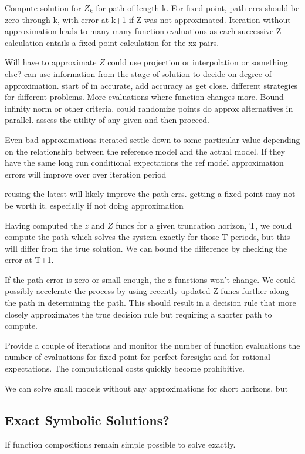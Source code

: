\documentclass[12pt]{article}
\begin{document}
Compute solution for $Z_k$ for path of length k.  For fixed point, path errs should be zero through k, with error at k+1 if Z was not approximated. 
Iteration without approximation leads to many many function evaluations as each successive Z calculation entails a fixed point calculation for the xz pairs.

Will have to approximate  $Z$  could use projection or interpolation or something else?  can use information from the stage of solution to decide on degree of approximation.  start of in accurate, add accuracy as get close.  different strategies for different problems.  More evaluations where function changes more.  
Bound infinity norm or other criteria.  could randomize points do approx alternatives in parallel.  assess the utility of any given and then proceed.

Even bad approximations iterated settle down to some particular value depending on the relationship between the reference model and the actual model.  If they have the same long run conditional expectations the ref model approximation errors will improve over over iteration period

reusing the latest will likely improve the path errs. getting a fixed point may not be worth it. especially if not doing approximation

Having computed the $z$ and $Z$ funcs for a given truncation horizon, T, we could compute the path which solves the system exactly for those T periods, but this will differ from the true solution.  We can bound the difference by checking the error at T+1.  

If the path error is zero or small enough, the z functions won't change.  We could possibly accelerate the process by using recently updated Z funcs further along the path in determining the path.  This should result in a decision rule that more closely approximates the true decision rule but requiring a shorter path to compute.

Provide a couple of iterations and monitor the number of function evaluations
the number of evaluations for fixed point for perfect foresight and for
rational expectations.  The computational costs quickly become prohibitive.

We can solve small models without any approximations for short horizons, but


\subsection{Exact Symbolic Solutions?}
\label{sec:exact-symb-solut}
If function compositions remain simple possible to solve exactly.
\end{document}
